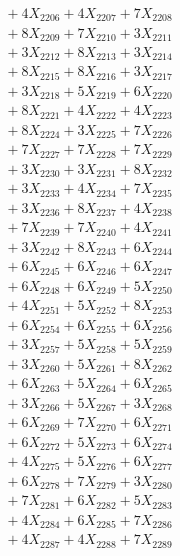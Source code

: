 \documentclass[a4paper,10pt]{article}
\begin{document}
{\begin{align}
&\;  + 4 X_{2206} + 4 X_{2207} + 7 X_{2208} \\[0.3ex]
&\;  + 8 X_{2209} + 7 X_{2210} + 3 X_{2211} \\[0.3ex]
&\;  + 3 X_{2212} + 8 X_{2213} + 3 X_{2214} \\[0.3ex]
&\;  + 8 X_{2215} + 8 X_{2216} + 3 X_{2217} \\[0.3ex]
&\;  + 3 X_{2218} + 5 X_{2219} + 6 X_{2220} \\[0.3ex]
&\;  + 8 X_{2221} + 4 X_{2222} + 4 X_{2223} \\[0.3ex]
&\;  + 8 X_{2224} + 3 X_{2225} + 7 X_{2226} \\[0.3ex]
&\;  + 7 X_{2227} + 7 X_{2228} + 7 X_{2229} \\[0.5ex]\allowbreak
&\;  + 3 X_{2230} + 3 X_{2231} + 8 X_{2232} \\[0.3ex]
&\;  + 3 X_{2233} + 4 X_{2234} + 7 X_{2235} \\[0.3ex]
&\;  + 3 X_{2236} + 8 X_{2237} + 4 X_{2238} \\[0.3ex]
&\;  + 7 X_{2239} + 7 X_{2240} + 4 X_{2241} \\[0.3ex]
&\;  + 3 X_{2242} + 8 X_{2243} + 6 X_{2244} \\[0.3ex]
&\;  + 6 X_{2245} + 6 X_{2246} + 6 X_{2247} \\[0.3ex]
&\;  + 6 X_{2248} + 6 X_{2249} + 5 X_{2250} \\[0.3ex]
&\;  + 4 X_{2251} + 5 X_{2252} + 8 X_{2253} \\[0.3ex]
&\;  + 6 X_{2254} + 6 X_{2255} + 6 X_{2256} \\[0.3ex]
&\;  + 3 X_{2257} + 5 X_{2258} + 5 X_{2259} \\[0.5ex]\allowbreak
&\;  + 3 X_{2260} + 5 X_{2261} + 8 X_{2262} \\[0.3ex]
&\;  + 6 X_{2263} + 5 X_{2264} + 6 X_{2265} \\[0.3ex]
&\;  + 3 X_{2266} + 5 X_{2267} + 3 X_{2268} \\[0.3ex]
&\;  + 6 X_{2269} + 7 X_{2270} + 6 X_{2271} \\[0.3ex]
&\;  + 6 X_{2272} + 5 X_{2273} + 6 X_{2274} \\[0.3ex]
&\;  + 4 X_{2275} + 5 X_{2276} + 6 X_{2277} \\[0.3ex]
&\;  + 6 X_{2278} + 7 X_{2279} + 3 X_{2280} \\[0.3ex]
&\;  + 7 X_{2281} + 6 X_{2282} + 5 X_{2283} \\[0.3ex]
&\;  + 4 X_{2284} + 6 X_{2285} + 7 X_{2286} \\[0.3ex]
&\;  + 4 X_{2287} + 4 X_{2288} + 7 X_{2289} \\[0.5ex]\allowbreak

\end{align}}
\end{document}
